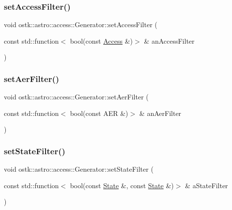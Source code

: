 \mbox{\label{classostk_1_1astro_1_1access_1_1_generator_ade3c6b8b5afe0f850e3531d715eac826}} 
\subsubsection{\texorpdfstring{set\+Access\+Filter()}{setAccessFilter()}}
{\footnotesize\ttfamily void ostk\+::astro\+::access\+::\+Generator\+::set\+Access\+Filter (\begin{DoxyParamCaption}\item[{const std\+::function$<$ bool(const \hyperlink{classostk_1_1astro_1_1_access}{Access} \&)$>$ \&}]{an\+Access\+Filter }\end{DoxyParamCaption})}

\mbox{\label{classostk_1_1astro_1_1access_1_1_generator_a4d82f15eb2da1fbf7c74b3136eed3301}} 
\subsubsection{\texorpdfstring{set\+Aer\+Filter()}{setAerFilter()}}
{\footnotesize\ttfamily void ostk\+::astro\+::access\+::\+Generator\+::set\+Aer\+Filter (\begin{DoxyParamCaption}\item[{const std\+::function$<$ bool(const A\+ER \&)$>$ \&}]{an\+Aer\+Filter }\end{DoxyParamCaption})}

\mbox{\label{classostk_1_1astro_1_1access_1_1_generator_a2e67d180ec17450e460be15f24a1d84d}} 
\subsubsection{\texorpdfstring{set\+State\+Filter()}{setStateFilter()}}
{\footnotesize\ttfamily void ostk\+::astro\+::access\+::\+Generator\+::set\+State\+Filter (\begin{DoxyParamCaption}\item[{const std\+::function$<$ bool(const \hyperlink{classostk_1_1astro_1_1trajectory_1_1_state}{State} \&, const \hyperlink{classostk_1_1astro_1_1trajectory_1_1_state}{State} \&)$>$ \&}]{a\+State\+Filter }\end{DoxyParamCaption})}

